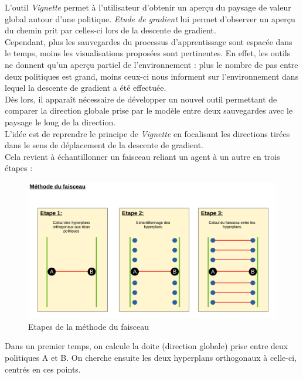 \documentclass[12pt]{article}
\begin{document}
L'outil \emph{Vignette} permet à l'utilisateur d'obtenir un aperçu du paysage de valeur global autour d'une politique. \emph{Etude de gradient} lui permet d'observer un aperçu du chemin prit par celles-ci lors de la descente de gradient. \\

Cependant, plus les sauvegardes du processus d'apprentissage sont espacée dans le temps, moins les visualisations proposées sont pertinentes. En effet, les outils ne donnent qu'un aperçu partiel de l'environnement : plus le nombre de pas entre deux politiques est grand, moins ceux-ci nous informent sur l'environnement dans lequel la descente de gradient a été effectuée. \\

Dès lors, il apparaît nécessaire de développer un nouvel outil permettant de comparer la direction globale prise par le modèle entre deux sauvegardes avec le paysage le long de la direction. \\

L'idée est de reprendre le principe de \emph{Vignette} en focalisant les directions tirées dans le sens de déplacement de la descente de gradient. \\

Cela revient à échantillonner un faisceau reliant un agent à un autre en trois étapes : \\

\begin{figure}[htp]
    \centering
    \includegraphics[width=15cm]{Images/faisceaux}
    \caption{Etapes de la méthode du faisceau}
    \label{fig:faisceaux}
\end{figure}

Dans un premier temps, on calcule la doite (direction globale) prise entre deux politiques A et B. On cherche ensuite les deux hyperplans orthogonaux à celle-ci, centrés en ces points. \\
\end{document}
